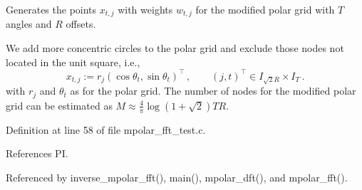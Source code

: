 Generates the points $x_{t,j}$ with weights $w_{t,j}$ for the modified polar grid with $T$ angles and $R$ offsets. 

We add more concentric circles to the polar grid and exclude those nodes not located in the unit square, i.e., \[ x_{t,j} := r_j\left(\cos\theta_t, \sin\theta_t\right)^{\top}\,,\qquad (j,t)^{\top}\in I_{\sqrt{2}R}\times I_T\,. \] with $r_j$ and $\theta_t$ as for the polar grid. The number of nodes for the modified polar grid can be estimated as $M \approx \frac{4}{\pi}\log(1+\sqrt{2}) T R$. 

Definition at line 58 of file mpolar\_\-fft\_\-test.c.

References PI.

Referenced by inverse\_\-mpolar\_\-fft(), main(), mpolar\_\-dft(), and mpolar\_\-fft().